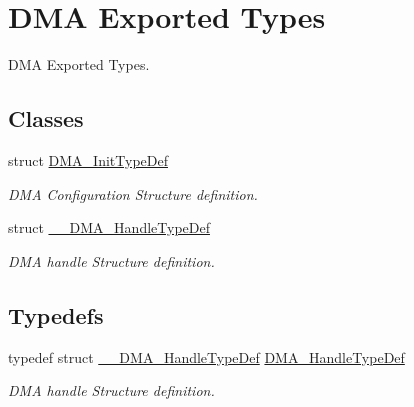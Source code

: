 \hypertarget{group___d_m_a___exported___types}{}\section{D\+MA Exported Types}
\label{group___d_m_a___exported___types}


D\+MA Exported Types.  


\subsection*{Classes}
\begin{DoxyCompactItemize}
\item 
struct \mbox{\hyperlink{struct_d_m_a___init_type_def}{D\+M\+A\+\_\+\+Init\+Type\+Def}}
\begin{DoxyCompactList}\small\item\em D\+MA Configuration Structure definition. \end{DoxyCompactList}\item 
struct \mbox{\hyperlink{struct_____d_m_a___handle_type_def}{\+\_\+\+\_\+\+D\+M\+A\+\_\+\+Handle\+Type\+Def}}
\begin{DoxyCompactList}\small\item\em D\+MA handle Structure definition. \end{DoxyCompactList}\end{DoxyCompactItemize}
\subsection*{Typedefs}
\begin{DoxyCompactItemize}
\item 
\mbox{\label{group___d_m_a___exported___types_ga41b754a906b86bce54dc79938970138b}} 
typedef struct \mbox{\hyperlink{struct_____d_m_a___handle_type_def}{\+\_\+\+\_\+\+D\+M\+A\+\_\+\+Handle\+Type\+Def}} \mbox{\hyperlink{group___d_m_a___exported___types_ga41b754a906b86bce54dc79938970138b}{D\+M\+A\+\_\+\+Handle\+Type\+Def}}
\begin{DoxyCompactList}\small\item\em D\+MA handle Structure definition. \end{DoxyCompactList}\end{DoxyCompactItemize}
